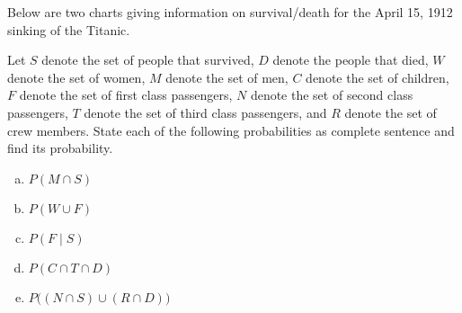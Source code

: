 \documentclass[11pt,letterpaper]{article}
\begin{document}
\newpage



 Below are two charts giving information on survival/death for the April 15, 1912 sinking of the Titanic. \par
        \begin{table}[h]
        \centering
         \hfill {}
        \end{table} \par
Let $S$ denote the set of people that survived, $D$ denote the people that died, $W$ denote the set of women, $M$ denote the set of men, $C$ denote the set of children, $F$ denote the set of first class passengers, $N$ denote the set of second class passengers, $T$ denote the set of third class passengers, and $R$ denote the set of crew members. State each of the following probabilities as complete sentence and find its probability. 
	\begin{enumerate}[(a)]
	\item $P(M \cap S)$
	\item $P(W \cup F)$
	\item $P(F \;|\; S)$
	\item $P(C \cap T \cap D)$
	\item $P\big( (N \cap S) \cup (R \cap D) \big)$
	\end{enumerate}
\end{document}
